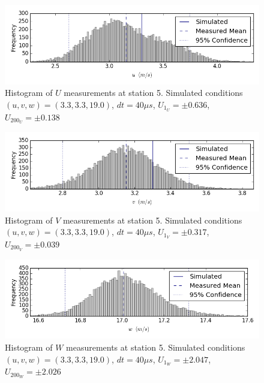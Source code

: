 \begin{figure}[H]
\centering
\includegraphics[width=6in]{figs/Ely_May28th05002/uncertainty_Ely_May28th05002_U}
\caption{Histogram of $U$ measurements at station 5. Simulated conditions $(u,v,w)=(3.3, 3.3, 19.0)$, $dt=40 \mu s$, $U_{1_{U}}=\pm 0.636$, $U_{200_{U}}=\pm 0.138$}
\label{fig:uncertainty_Ely_May28th05002_U}
\end{figure}


\begin{figure}[H]
\centering
\includegraphics[width=6in]{figs/Ely_May28th05002/uncertainty_Ely_May28th05002_V}
\caption{Histogram of $V$ measurements at station 5. Simulated conditions $(u,v,w)=(3.3, 3.3, 19.0)$, $dt=40 \mu s$, $U_{1_{V}}=\pm 0.317$, $U_{200_{V}}=\pm 0.039$}
\label{fig:uncertainty_Ely_May28th05002_V}
\end{figure}


\begin{figure}[H]
\centering
\includegraphics[width=6in]{figs/Ely_May28th05002/uncertainty_Ely_May28th05002_W}
\caption{Histogram of $W$ measurements at station 5. Simulated conditions $(u,v,w)=(3.3, 3.3, 19.0)$, $dt=40 \mu s$, $U_{1_{W}}=\pm 2.047$, $U_{200_{W}}=\pm 2.026$}
\label{fig:uncertainty_Ely_May28th05002_W}
\end{figure}


